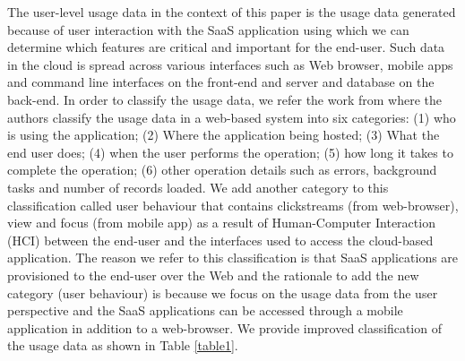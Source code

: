 \documentclass[a4paper,twoside]{article}
\begin{document}
The user-level usage data in the context of this paper is the usage data generated because of user interaction with the SaaS application using which we can determine which features are critical and important for the end-user. Such data in the cloud is spread across various interfaces such as Web browser, mobile apps and command line interfaces on the front-end and server and database on the back-end. In order to classify the usage data, we refer the work from \cite{Pachidi2014UnderstandingMining} where the authors classify the usage data in a web-based system into six categories: (1) who is using the application; (2) Where the application being hosted; (3) What the end user does; (4) when the user performs the operation; (5) how long it takes to complete the operation; (6) other operation details such as errors, background tasks and number of records loaded. We add another category to this classification called user behaviour that contains clickstreams (from web-browser), view and focus (from mobile app) as a result of Human-Computer Interaction (HCI) between the end-user and the interfaces used to access the cloud-based application. The reason we refer to this classification is that SaaS applications are provisioned to the end-user over the Web and the rationale to add the new category (user behaviour) is because we focus on the usage data from the user perspective and the SaaS applications can be accessed through a mobile application in addition to a web-browser. We provide improved classification of the usage data as shown in Table \ref{table1}. \\
\end{document}

